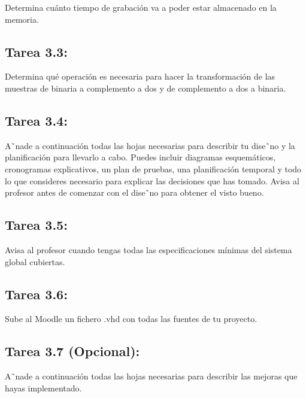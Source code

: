\documentclass{article}
\begin{document}
Determina cuánto tiempo de grabación va a poder estar almacenado en la memoria.

\subsection{Tarea 3.3:}
Determina qué operación es necesaria para hacer la transformación de las muestras de binaria a complemento a dos y de complemento a dos a binaria.

\subsection{Tarea 3.4:}
A˜nade a continuación todas las hojas necesarias para describir tu dise˜no y la planificación para llevarlo a cabo. Puedes incluir diagramas esquemáticos, cronogramas explicativos, un plan de pruebas, una planificación temporal y todo lo que consideres necesario para explicar las decisiones que has tomado.
Avisa al profesor antes de comenzar con el dise˜no para obtener el visto bueno.

\subsection{Tarea 3.5:}
Avisa al profesor cuando tengas todas las especificaciones mínimas del sistema global cubiertas.

\subsection{Tarea 3.6:
}
Sube al Moodle un fichero .vhd con todas las fuentes de tu proyecto.

\subsection{Tarea 3.7 (Opcional):}
A˜nade a continuación todas las hojas necesarias para describir las mejoras que hayas implementado.
\end{document}
